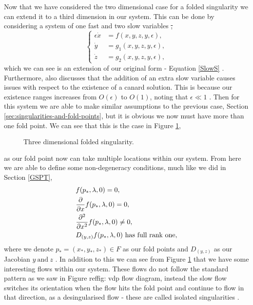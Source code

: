 
Now that we have considered the two dimensional case for a folded singularity we can extend it to a third dimension in our system. This can be done by considering a system of one fast and two slow variables \st, 
\begin{equation}
\begin{cases}
\epsilon \dot{x}&=f(x,y,z,y,\epsilon),\\
\dot{y}&=g_1(x,y,z,y,\epsilon),\\
\dot{z}&=g_2(x,y,z,y,\epsilon),
\end{cases}\label{eq: fs singularity system}
\end{equation}
which we can see is an extension of our original form - Equation \ref{SlowS} \citep{MMO}. Furthermore, \citet{MMO} also discusses that the addition of an extra slow variable causes issues with respect to the existence of a canard solution. This is because our existence ranges increases from $ O(\epsilon) $ to $ O(1) $, noting that $ \epsilon\ll 1 $ \citep{MMO}. Then for this system we are able to make similar assumptions to the previous case, Section \ref{sec:singularities-and-fold-points}, but it is obvious we now must have more than one fold point. We can see that this is the case in Figure \ref{fig: 3d folded singularity},
\begin{figure}[h!]\centering
	\caption{Three dimensional folded singularity.}
	\label{fig: 3d folded singularity}
\end{figure}
as our fold point now can take multiple locations within our system. From here we are able to define some non-degeneracy conditions, much like we did in Section \ref{GSPT},
\begin{equation}
\begin{aligned}
&f(p_*,\lambda,0)=0,\\
&\pd{}{x}f(p_*,\lambda,0)=0,\\
&\pd{^2}{x^2}f(p_*,\lambda,0)\neq 0,\\
&D_{(y,z)}f(p_*,\lambda,0) \ \text{has full rank one},
\end{aligned}
\label{eq: non-degeneracy 3d system}	
\end{equation}
where we denote $ p_*=(x_*,y_*,z_*)\in F $ as our fold points and $ D_{(y,z)} $ as our Jacobian \wrt $ y \ \text{and}\ z $ \citep{MMO}. In addition to this we can see from Figure \ref{fig: 3d folded singularity} that we have some interesting flows within our system. These flows do not follow the standard pattern as we saw in Figure ref{fig: vdp flow diagram}, instead the slow flow switches its orientation when the flow hits the fold point and continue to flow in that direction, as a desingularised flow - these are called isolated singularities \citep{MMO}. %
